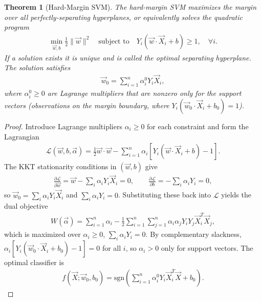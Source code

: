 \documentclass[11pt]{article}
\theoremstyle{definition}
\theoremstyle{plain}
\newtheorem{theorem}{Theorem}[section]
\theoremstyle{remark}
\begin{document}
\begin{theorem}[Hard-Margin SVM]
    The \emph{hard-margin SVM} maximizes the margin over all perfectly-separating hyperplanes, or equivalently solves the quadratic program
    \begin{align}
        \min_{\vec{w},b} \frac{1}{2}\|\vec{w}\|^2 \quad \text{subject to} \quad Y_i(\vec{w}\cdot\vec{X}_i + b) \geq 1, \quad \forall i.
    \end{align}
    If a solution exists it is unique and is called the \emph{optimal separating hyperplane}. The solution satisfies
    \begin{align}
        \vec{w}_0 = \sum_{i=1}^n \alpha_i^0 Y_i \vec{X}_i,
    \end{align}
    where $\alpha_i^0 \geq 0$ are Lagrange multipliers that are nonzero only for the support vectors (observations on the margin boundary, where $Y_i(\vec{w}_0\cdot\vec{X}_i + b_0) = 1$).
\end{theorem}
\begin{proof}
    Introduce Lagrange multipliers $\alpha_i \geq 0$ for each constraint and form the Lagrangian
    \begin{align}
        \mathcal{L}(\vec{w},b,\vec{\alpha}) = \frac{1}{2}\vec{w}\cdot\vec{w} - \sum_{i=1}^n \alpha_i[Y_i(\vec{w}\cdot\vec{X}_i+b)-1].
    \end{align}
    The KKT stationarity conditions in $(\vec{w},b)$ give
    \begin{align}
        \frac{\partial \mathcal{L}}{\partial \vec{w}} = \vec{w} - \sum_i \alpha_i Y_i \vec{X}_i = 0, \qquad \frac{\partial \mathcal{L}}{\partial b} = -\sum_i \alpha_i Y_i = 0,
    \end{align}
    so $\vec{w}_0 = \sum_i \alpha_i Y_i \vec{X}_i$ and $\sum_i \alpha_i Y_i = 0$. Substituting these back into $\mathcal{L}$ yields the dual objective
    \begin{align}
        W(\vec{\alpha}) = \sum_{i=1}^n \alpha_i - \frac{1}{2}\sum_{i=1}^n\sum_{j=1}^n \alpha_i\alpha_j Y_i Y_j \vec{X}_i^T\vec{X}_j,
    \end{align}
    which is maximized over $\alpha_i \geq 0$, $\sum_i \alpha_i Y_i = 0$. By complementary slackness, $\alpha_i[Y_i(\vec{w}_0\cdot\vec{X}_i+b_0)-1]=0$ for all $i$, so $\alpha_i > 0$ only for support vectors. The optimal classifier is
    \begin{align}
        f(\vec{X};\vec{w}_0,b_0) = \mathrm{sgn}\!\left(\sum_{i=1}^n \alpha_i^0 Y_i \vec{X}_i^T\vec{X} + b_0\right).
    \end{align}
\end{proof}
\end{document}
